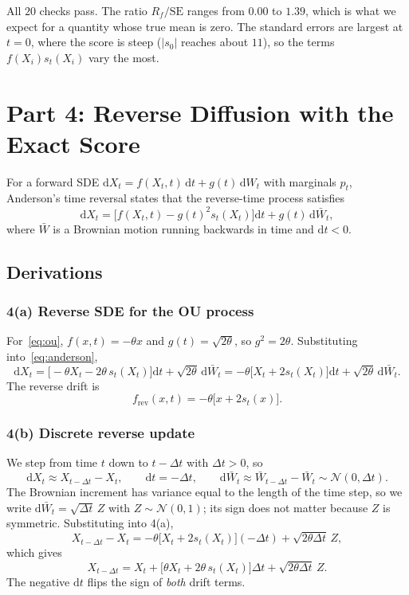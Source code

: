 \documentclass[11pt]{article}
\newcommand{\N}{\mathcal{N}}
\newcommand{\dd}{\mathrm{d}}
\begin{document}
All $20$ checks pass. The ratio $R_f/\mathrm{SE}$ ranges from $0.00$ to $1.39$, which is what we expect for a quantity
whose true mean is zero. The standard errors are largest at $t=0$, where the score is steep ($|s_0|$ reaches about $11$),
so the terms $f(X_i)s_t(X_i)$ vary the most.

\section*{Part 4: Reverse Diffusion with the Exact Score}

For a forward SDE $\dd X_t = f(X_t,t)\,\dd t + g(t)\,\dd W_t$ with marginals $p_t$, Anderson's time reversal states that the
reverse-time process satisfies
\begin{equation}\label{eq:anderson}
\dd X_t = \bigl[f(X_t,t) - g(t)^2 s_t(X_t)\bigr]\dd t + g(t)\,\dd\bar W_t ,
\end{equation}
where $\bar W$ is a Brownian motion running backwards in time and $\dd t<0$.

\subsection*{Derivations}

\subsubsection*{4(a) Reverse SDE for the OU process}

For~\eqref{eq:ou}, $f(x,t) = -\theta x$ and $g(t) = \sqrt{2\theta}$, so $g^2 = 2\theta$. Substituting into~\eqref{eq:anderson},
\[
\dd X_t = \bigl[-\theta X_t - 2\theta\,s_t(X_t)\bigr]\dd t + \sqrt{2\theta}\,\dd\bar W_t
= -\theta\bigl[X_t + 2s_t(X_t)\bigr]\dd t + \sqrt{2\theta}\,\dd\bar W_t .
\]
The reverse drift is
\[
\boxed{f_{\mathrm{rev}}(x,t) = -\theta\bigl[x + 2s_t(x)\bigr].}
\]

\subsubsection*{4(b) Discrete reverse update}

We step from time $t$ down to $t-\Delta t$ with $\Delta t>0$, so
\[
\dd X_t \approx X_{t-\Delta t} - X_t, \qquad \dd t = -\Delta t, \qquad \dd\bar W_t \approx \bar W_{t-\Delta t} - \bar W_t \sim \N(0,\Delta t).
\]
The Brownian increment has variance equal to the length of the time step, so we write $\dd\bar W_t = \sqrt{\Delta t}\,Z$ with
$Z\sim\N(0,1)$; its sign does not matter because $Z$ is symmetric. Substituting into 4(a),
\[
X_{t-\Delta t} - X_t = -\theta\bigl[X_t + 2s_t(X_t)\bigr](-\Delta t) + \sqrt{2\theta\Delta t}\,Z ,
\]
which gives
\begin{equation}\label{eq:reverse}
\boxed{X_{t-\Delta t} = X_t + \bigl[\theta X_t + 2\theta\,s_t(X_t)\bigr]\Delta t + \sqrt{2\theta\Delta t}\,Z .}
\end{equation}
The negative $\dd t$ flips the sign of \emph{both} drift terms.
\end{document}

